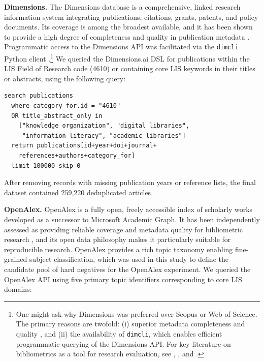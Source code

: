 \documentclass[11pt,a4paper]{article}
\begin{document}
\textbf{Dimensions.} The Dimensions database \citep{hook2018dimensions} is a comprehensive, linked research information system integrating publications, citations, grants, patents, and policy documents. Its coverage is among the broadest available, and it has been shown to provide a high degree of completeness and quality in publication metadata \citep{delgado2024completeness, nguyen2022quality}. Programmatic access to the Dimensions API was facilitated via the \texttt{dimcli} Python client \citep{dimcli2021}.\footnote{One might ask why Dimensions was preferred over Scopus or Web of Science. The primary reasons are twofold: (i) superior metadata completeness and quality \citep{delgado2024completeness, nguyen2022quality}, and (ii) the availability of \texttt{dimcli}, which enables efficient programmatic querying of the Dimensions API. For key literature on bibliometrics as a tool for research evaluation, see \citet{debellis2009bibliometrics}, \citet{hicks2012bibliometrics}, and \citet{bornmann2017measuring}.} We queried the Dimensions.ai DSL for publications within the LIS Field of Research code (4610) or containing core LIS keywords in their titles or abstracts, using the following query:

\begin{verbatim}
search publications
  where category_for.id = "4610"
  OR title_abstract_only in
    ["knowledge organization", "digital libraries",
     "information literacy", "academic libraries"]
  return publications[id+year+doi+journal+
    references+authors+category_for]
  limit 100000 skip 0
\end{verbatim}

After removing records with missing publication years or reference lists, the final dataset contained 259,220 deduplicated articles.

\textbf{OpenAlex.} OpenAlex \citep{priem2022openalex} is a fully open, freely accessible index of scholarly works developed as a successor to Microsoft Academic Graph. It has been independently assessed as providing reliable coverage and metadata quality for bibliometric research \citep{delgado2024completeness, nguyen2022quality}, and its open data philosophy makes it particularly suitable for reproducible research. OpenAlex provides a rich topic taxonomy enabling fine-grained subject classification, which was used in this study to define the candidate pool of hard negatives for the OpenAlex experiment. We queried the OpenAlex API using five primary topic identifiers corresponding to core LIS domains:
\end{document}
